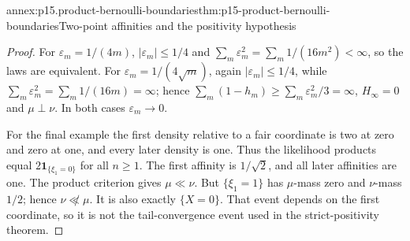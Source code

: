 \begin{annexitem}{annex:p15.product-bernoulli-boundaries}{thm:p15-product-bernoulli-boundaries}{Two-point affinities and the positivity hypothesis}
\begin{proof}
For \(\varepsilon_m=1/(4m)\), \(|\varepsilon_m|\leq1/4\) and
\(\sum_m\varepsilon_m^2=\sum_m1/(16m^2)<\infty\), so the laws are
equivalent. For \(\varepsilon_m=1/(4\sqrt m)\), again
\(|\varepsilon_m|\leq1/4\), while
\(\sum_m\varepsilon_m^2=\sum_m1/(16m)=\infty\); hence
\(\sum_m(1-h_m)\geq\sum_m\varepsilon_m^2/3=\infty\), \(H_\infty=0\) and
\(\mu\perp\nu\). In both cases \(\varepsilon_m\to0\).

For the final example the first density relative to a fair coordinate
is two at zero and zero at one, and every later density is one.
Thus the likelihood products equal
\(2\mathbf1_{\{\xi_1=0\}}\) for all \(n\geq1\).
The first affinity is \(1/\sqrt2\), and all later affinities are one.
The product criterion gives \(\mu\ll\nu\).
But \(\{\xi_1=1\}\) has \(\mu\)-mass zero and \(\nu\)-mass \(1/2\);
hence \(\nu\not\ll\mu\). It is also exactly \(\{X=0\}\).
That event depends on the first coordinate, so it is not the
tail-convergence event used in the strict-positivity theorem.
\end{proof}
\end{annexitem}

